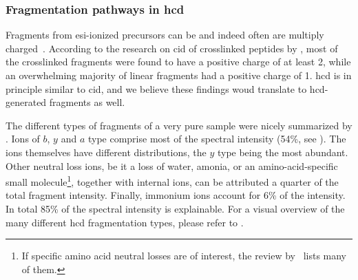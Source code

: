 \subsubsection{Fragmentation pathways in \gls*{hcd}}

Fragments from \gls*{esi}-ionized precursors can be and indeed often are multiply charged~\cite{katta1991use, michalski2012systematic}. According to the research on \gls*{cid} of crosslinked peptides by \citet{giese2016study}, most of the crosslinked fragments were found to have a positive charge of at least 2, while an overwhelming majority of linear fragments had a positive charge of 1. \gls*{hcd} is in principle similar to \gls*{cid}, and we believe these findings woud translate to \gls*{hcd}-generated fragments as well.

The different types of fragments of a very pure sample were nicely summarized by \citet{michalski2012systematic}. Ions of \(b\), \(y\) and \(a\) type comprise most of the spectral intensity (54\%, see ). The ions themselves have different distributions, the \(y\) type being the most abundant. Other neutral loss ions, be it a loss of water, amonia, or an amino-acid-specific small molecule\footnote{If specific amino acid neutral losses are of interest, the review by~\citet{paizs2005fragmentation} lists many of them.}, together with internal ions, can be attributed a quarter of the total fragment intensity. Finally, immonium ions account for 6\% of the intensity. In total 85\% of the spectral intensity is explainable. For a visual overview of the many different \gls*{hcd} fragmentation types, please refer to .

